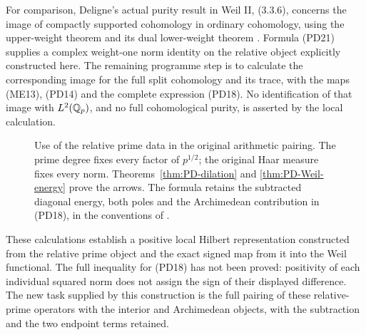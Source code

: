 For comparison, Deligne's actual purity result in Weil II, (3.3.6),
concerns the image of compactly supported cohomology in ordinary
cohomology, using the upper-weight theorem and its dual lower-weight
theorem \cite{DeligneII}. Formula (PD21) supplies a complex weight-one
norm identity on the relative object explicitly constructed here. The
remaining programme step is to calculate the corresponding image for
the full split cohomology and its trace, with the maps (ME13), (PD14)
and the complete expression (PD18). No identification of that image
with $L^2(\mathbb Q_p)$, and no full cohomological purity, is asserted by
the local calculation.

\begin{figure}[ht]
\centering
{}
\caption{Use of the relative prime data in the original arithmetic pairing.
The prime degree fixes every factor of $p^{1/2}$; the original Haar
measure fixes every norm. Theorems~\ref{thm:PD-dilation} and
\ref{thm:PD-Weil-energy} prove the arrows. The formula retains the
subtracted diagonal energy, both poles and the Archimedean contribution
in (PD18), in the conventions of \cite{Connes1998,Connes2026}.}
\end{figure}

These calculations establish a positive local Hilbert representation
constructed from the relative prime object and the exact signed map
from it into the Weil functional. The full inequality for (PD18) has
not been proved: positivity of each individual squared norm does not
assign the sign of their displayed difference. The new task supplied
by this construction is the full pairing of these relative-prime
operators with the interior and Archimedean objects, with the
subtraction and the two endpoint terms retained.
